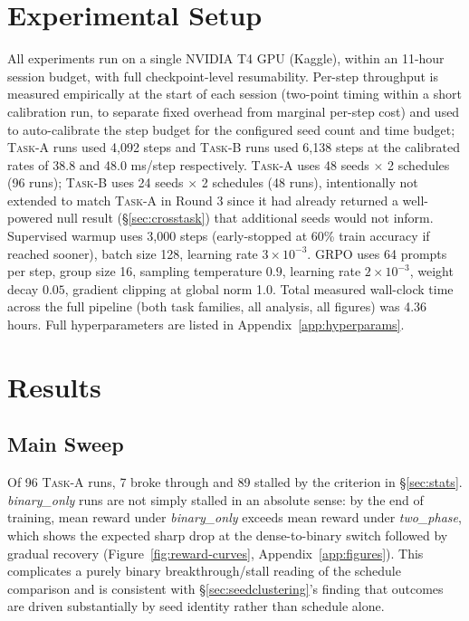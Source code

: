 \documentclass{article}
\newcommand{\taskA}{\textsc{Task-A}}
\newcommand{\taskB}{\textsc{Task-B}}
\begin{document}
\section{Experimental Setup}
\label{sec:setup}

All experiments run on a single NVIDIA T4 GPU (Kaggle), within an 11-hour
session budget, with full checkpoint-level resumability. Per-step throughput is
measured empirically at the start of each session (two-point timing within a
short calibration run, to separate fixed overhead from marginal per-step cost)
and used to auto-calibrate the step budget for the configured seed count and
time budget; \taskA{} runs used 4{,}092 steps and \taskB{} runs used 6{,}138
steps at the calibrated rates of 38.8 and 48.0 ms/step respectively. \taskA{}
uses 48 seeds $\times$ 2 schedules (96 runs); \taskB{} uses 24 seeds $\times$ 2
schedules (48 runs), intentionally not extended to match \taskA{} in Round 3
since it had already returned a well-powered null result (\S\ref{sec:crosstask})
that additional seeds would not inform. Supervised warmup uses 3{,}000 steps
(early-stopped at 60\% train accuracy if reached sooner), batch size 128,
learning rate $3\times10^{-3}$. GRPO uses 64 prompts per step, group size 16,
sampling temperature $0.9$, learning rate $2\times10^{-3}$, weight decay
$0.05$, gradient clipping at global norm 1.0. Total measured wall-clock time
across the full pipeline (both task families, all analysis, all figures) was
4.36 hours. Full hyperparameters are listed in Appendix~\ref{app:hyperparams}.

\section{Results}
\label{sec:results}

\subsection{Main Sweep}
Of 96 \taskA{} runs, 7 broke through and 89 stalled by the criterion in
\S\ref{sec:stats}. \emph{binary\_only} runs are not simply stalled in an
absolute sense: by the end of training, mean reward under \emph{binary\_only}
exceeds mean reward under \emph{two\_phase}, which shows the expected sharp
drop at the dense-to-binary switch followed by gradual recovery
(Figure~\ref{fig:reward-curves}, Appendix~\ref{app:figures}). This complicates
a purely binary breakthrough/stall reading of the schedule comparison and is
consistent with \S\ref{sec:seedclustering}'s finding that outcomes are driven
substantially by seed identity rather than schedule alone.
\end{document}
